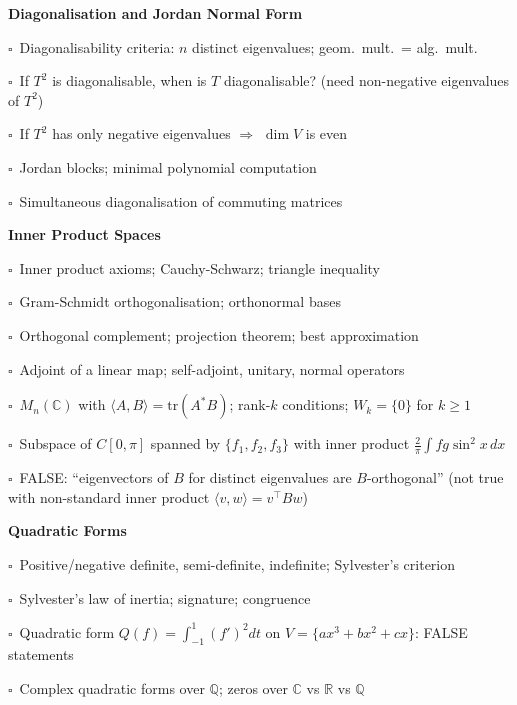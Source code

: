 \documentclass[11pt,a4paper]{article}
\newcommand{\chk}{\textcolor{rulegray}{$\square$}\ }
\begin{document}
\begin{subtopics}
  \item \textbf{Diagonalisation and Jordan Normal Form}
  \begin{subtopics}
    \item \chk Diagonalisability criteria: $n$ distinct eigenvalues; geom.\ mult.\ = alg.\ mult.
    \item \chk If $T^2$ is diagonalisable, when is $T$ diagonalisable? (need non-negative eigenvalues of $T^2$)
    \item \chk If $T^2$ has only negative eigenvalues $\Rightarrow$ $\dim V$ is even
    \item \chk Jordan blocks; minimal polynomial computation
    \item \chk Simultaneous diagonalisation of commuting matrices
  \end{subtopics}

  \item \textbf{Inner Product Spaces}
  \begin{subtopics}
    \item \chk Inner product axioms; Cauchy-Schwarz; triangle inequality
    \item \chk Gram-Schmidt orthogonalisation; orthonormal bases
    \item \chk Orthogonal complement; projection theorem; best approximation
    \item \chk Adjoint of a linear map; self-adjoint, unitary, normal operators
    \item \chk $M_n(\mathbb{C})$ with $\langle A,B\rangle = \mathrm{tr}(A^*B)$; rank-$k$ conditions; $W_k=\{0\}$ for $k\ge 1$
    \item \chk Subspace of $C[0,\pi]$ spanned by $\{f_1,f_2,f_3\}$ with inner product $\frac{2}{\pi}\int f g \sin^2 x\,dx$
    \item \chk FALSE: ``eigenvectors of $B$ for distinct eigenvalues are $B$-orthogonal'' (not true with non-standard inner product $\langle v,w\rangle=v^\top Bw$)
  \end{subtopics}

  \item \textbf{Quadratic Forms}
  \begin{subtopics}
    \item \chk Positive/negative definite, semi-definite, indefinite; Sylvester's criterion
    \item \chk Sylvester's law of inertia; signature; congruence
    \item \chk Quadratic form $Q(f)=\int_{-1}^1(f')^2dt$ on $V=\{ax^3+bx^2+cx\}$: FALSE statements
    \item \chk Complex quadratic forms over $\mathbb{Q}$; zeros over $\mathbb{C}$ vs $\mathbb{R}$ vs $\mathbb{Q}$
  \end{subtopics}


\end{subtopics}
\end{document}

